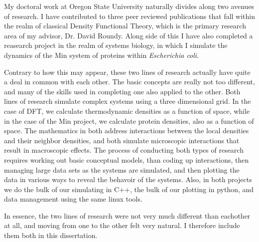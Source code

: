 My doctoral work at Oregon State University naturally divides along
two avenues of research.  I have contributed to three peer reviewed
publications that fall within the realm of classical Density
Functional Theory, which is the primary research area of my advisor,
Dr. David Roundy.  Along side of this I have also completed a
reasearch project in the realm of systems biology, in which I simulate
the dynamics of the Min system of proteins within \emph{Escherichia
  coli}.

Contrary to how this may appear, these two lines of research actually
have quite a deal in common with each other.  The basic concepts are
really not too different, and many of the skills used in completing
one also applied to the other.  Both lines of research simulate
complex systems using a three dimensional grid.  In the case of DFT,
we calculate thermodynamic densities as a function of space, while in
the case of the Min project, we calculate protein densities, also as a
function of space.  The mathematics in both address interactions
between the local densities and their neighbor densities, and both
simulate microscopic interactions that result in macroscopic effects.
The process of conducting both types of research requires working out
basic conceptual models, than coding up interactions, then managing
large data sets as the systems are simulated, and then plotting the
data in various ways to reveal the behavoir of the systems.  Also, in
both projects we do the bulk of our simulating in C++, the bulk of our
plotting in python, and data management using the same linux tools.

In essence, the two lines of research were not very much different
than eachother at all, and moving from one to the other felt very
natural.  I therefore include them both in this dissertation.



